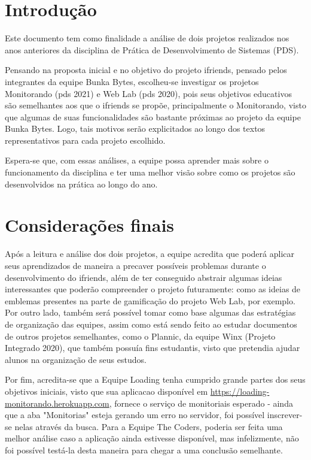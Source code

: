 \chapter{Introdução}
Este documento tem como finalidade a análise de dois projetos realizados nos anos anteriores da disciplina de Prática de Desenvolvimento de Sistemas (PDS).

Pensando na proposta inicial e no objetivo do projeto \gls{ifriends}, pensado pelos integrantes da equipe Bunka Bytes, escolheu-se investigar os projetos Monitorando (\acs{pds} 2021) e Web Lab (\acs{pds} 2020), pois seus objetivos educativos são semelhantes aos que o \gls{ifriends} se propõe, principalmente o Monitorando, visto que algumas de suas funcionalidades são bastante próximas ao projeto da equipe Bunka Bytes. Logo, tais motivos serão explicitados ao longo dos textos representativos para cada projeto escolhido.

Espera-se que, com essas análises, a equipe possa aprender mais sobre o funcionamento da disciplina e ter uma melhor visão sobre como os projetos são desenvolvidos na prática ao longo do ano.




\chapter{Considerações finais}
Após a leitura e análise dos dois projetos, a equipe acredita que poderá aplicar seus aprendizados de maneira a precaver possíveis problemas  durante o desenvolvimento do \gls{ifriends}, além de ter conseguido abstrair algumas ideias interessantes que poderão compreender o projeto futuramente: como as ideias de emblemas presentes na parte de gamificação do projeto Web Lab, por exemplo. Por outro lado, também será possível tomar como base algumas das estratégias de organização das equipes, assim como está sendo feito ao estudar documentos de outros projetos semelhantes, como o Plannic, da equipe Winx (Projeto Integrado 2020), que também possuía fins estudantis, visto que pretendia ajudar alunos na organização de seus estudos. 

Por fim, acredita-se que a Equipe Loading tenha cumprido grande partes dos seus objetivos iniciais, visto que sua aplicacao disponível em  \url{https://loading-monitorando.herokuapp.com}, fornece o serviço de monitoriais esperado - ainda que a aba "Monitorias" esteja gerando um erro no servidor, foi possível inscrever-se nelas através da busca. Para a Equipe The Coders, poderia ser feita uma melhor análise caso a aplicação ainda estivesse disponível, mas infelizmente, não foi possível testá-la desta maneira para chegar a uma conclusão semelhante. 